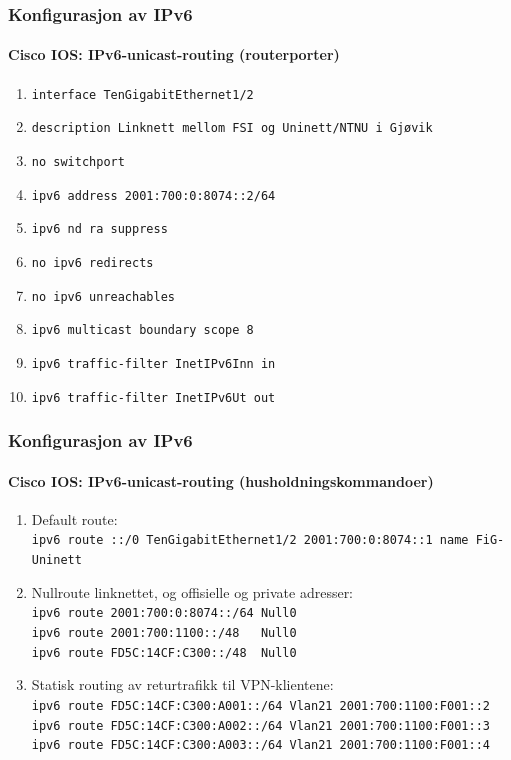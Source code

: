 \begin{frame}%
  \frametitle{Konfigurasjon av IPv6}
  \framesubtitle{Cisco IOS: IPv6-unicast-routing (routerporter)}
  \begin{enumerate}%
  \item \alert{\texttt{interface TenGigabitEthernet1/2}}
  \item \texttt{description Linknett mellom FSI og Uninett/NTNU i Gjøvik}
  \item \alert{\texttt{no switchport}}
  \item \alert{\texttt{ipv6 address 2001:700:0:8074::2/64}}
  \item \alert{\texttt{ipv6 nd ra suppress}}
  \item \alert{\texttt{no ipv6 redirects}}
  \item \alert{\texttt{no ipv6 unreachables}}
  \item \alert{\texttt{ipv6 multicast boundary scope 8}}
  \item \alert{\texttt{ipv6 traffic-filter InetIPv6Inn in}}
  \item \alert{\texttt{ipv6 traffic-filter InetIPv6Ut out}}
  \end{enumerate}
\end{frame}

\begin{frame}[fragile]%
  \frametitle{Konfigurasjon av IPv6}
  \framesubtitle{Cisco IOS: IPv6-unicast-routing (husholdningskommandoer)}
  \begin{enumerate}%
  \item Default route:\\
    \alert{\texttt{\small ipv6 route ::/0 TenGigabitEthernet1/2 2001:700:0:8074::1 name FiG-Uninett}}
  \item Nullroute linknettet, og offisielle og private adresser:\\
    \alert{\texttt{ipv6 route 2001:700:0:8074::/64 Null0}}\\
    \alert{\texttt{ipv6 route 2001:700:1100::/48\ \ \ Null0}}\\
    \alert{\texttt{ipv6 route FD5C:14CF:C300::/48\ \  Null0}}
  \item Statisk routing av returtrafikk til VPN-klientene:\\
    \alert{\texttt{ipv6 route FD5C:14CF:C300:A001::/64 Vlan21 2001:700:1100:F001::2}}\\
    \alert{\texttt{ipv6 route FD5C:14CF:C300:A002::/64 Vlan21 2001:700:1100:F001::3}}\\
    \alert{\texttt{ipv6 route FD5C:14CF:C300:A003::/64 Vlan21 2001:700:1100:F001::4}}
  \end{enumerate}
\end{frame}

